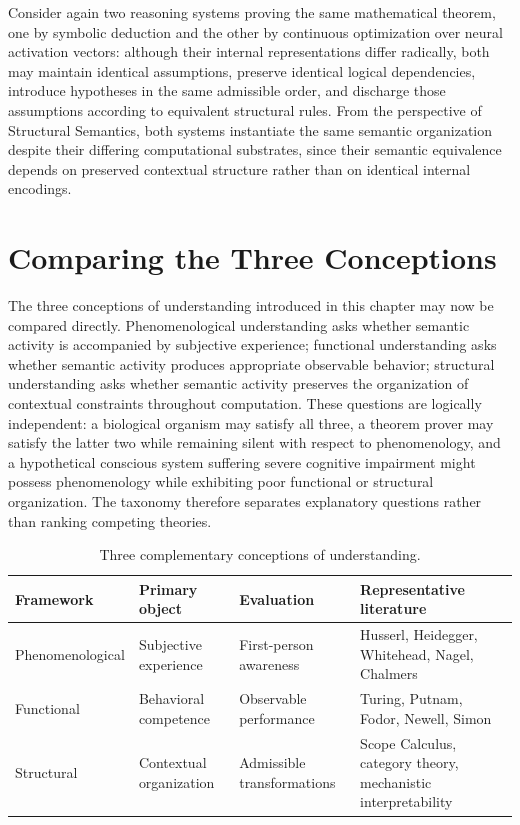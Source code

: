 \documentclass[11pt,twoside,openright]{book}
\numberwithin{equation}{chapter}
\theoremstyle{definition}
\theoremstyle{plain}
\theoremstyle{remark}
\theoremstyle{definition}
\begin{document}
Consider again two reasoning systems proving the same mathematical
theorem, one by symbolic deduction and the other by continuous
optimization over neural activation vectors: although their internal
representations differ radically, both may maintain identical
assumptions, preserve identical logical dependencies, introduce
hypotheses in the same admissible order, and discharge those assumptions
according to equivalent structural rules. From the perspective of
Structural Semantics, both systems instantiate the same semantic
organization despite their differing computational substrates, since
their semantic equivalence depends on preserved contextual structure
rather than on identical internal encodings.

\section{Comparing the Three Conceptions}

The three conceptions of understanding introduced in this chapter may now
be compared directly. Phenomenological understanding asks whether
semantic activity is accompanied by subjective experience; functional
understanding asks whether semantic activity produces appropriate
observable behavior; structural understanding asks whether semantic
activity preserves the organization of contextual constraints throughout
computation. These questions are logically independent: a biological
organism may satisfy all three, a theorem prover may satisfy the latter
two while remaining silent with respect to phenomenology, and a
hypothetical conscious system suffering severe cognitive impairment might
possess phenomenology while exhibiting poor functional or structural
organization. The taxonomy therefore separates explanatory questions
rather than ranking competing theories.

\begin{table}[h]
\centering
\begin{tabular}{p{3.6cm}p{3cm}p{3cm}p{4.4cm}}
\toprule
Framework & Primary object & Evaluation & Representative literature \\
\midrule
Phenomenological & Subjective experience & First-person awareness &
Husserl, Heidegger, Whitehead, Nagel, Chalmers \\
Functional & Behavioral competence & Observable performance &
Turing, Putnam, Fodor, Newell, Simon \\
Structural & Contextual organization & Admissible transformations &
Scope Calculus, category theory, mechanistic interpretability \\
\bottomrule
\end{tabular}
\caption{Three complementary conceptions of understanding.}
\end{table}
\end{document}
